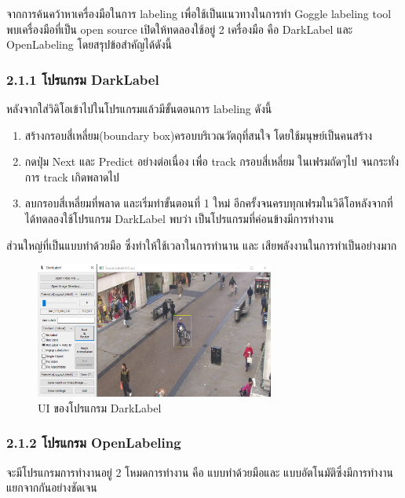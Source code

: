 จากการค้นคว้าหาเครื่องมือในการ labeling เพื่อใช้เป็นแนวทางในการทำ Goggle labeling tool พบเครื่องมือที่เป็น open source เปิดให้ทดลองใช้อยู่ 2 เครื่องมือ คือ DarkLabel และ OpenLabeling โดยสรุปข้อสำคัญได้ดังนี้ 

\subsubsection*{2.1.1 โปรแกรม DarkLabel}
หลังจากใส่วิดิโอเข้าไปในโปรแกรมแล้วมีขั้นตอนการ labeling ดังนี้ 
\begin{enumerate}
	\setlength\itemsep{-0.25em}
	\item สร้างกรอบสี่เหลี่ยม(boundary box)ครอบบริเวณวัตถุที่สนใจ โดยใช้มนุษย์เป็นคนสร้าง
	\item กดปุ่ม Next และ Predict อย่างต่อเนื่อง เพื่อ track กรอบสี่เหลี่ยม ในเฟรมถัดๆไป จนกระทั่งการ track เกิดพลาดไป
	\item ลบกรอบสี่เหลี่ยมที่พลาด และเริ่มทำขั้นตอนที่ 1 ใหม่ อีกครั้งจนครบทุกเฟรมในวิดีโอหลังจากที่ได้ทดลองใช้โปรแกรม DarkLabel พบว่า เป็นโปรแกรมที่ค่อนข้างมีการทำงาน
\end{enumerate}
ส่วนใหญ่ที่เป็นแบบทำด้วยมือ ซึ่งทำให้ใช้เวลาในการทำนาน และ เสียพลังงานในการทำเป็นอย่างมาก

\begin{figure}[!ht]
	\centering
	\includegraphics[width=0.7\textwidth]{chapter2/images/darklabel.png}
		\caption{UI ของโปรแกรม DarkLabel}
    	\label{fig:darklabel}
\end{figure}


\clearpage
\subsubsection*{2.1.2 โปรแกรม OpenLabeling}
จะมีโปรแกรมการทำงานอยู่ 2 โหมดการทำงาน คือ แบบทำด้วยมือและ แบบอัตโนมัติซึ่งมีการทำงานแยกจากกันอย่างชัดเจน

